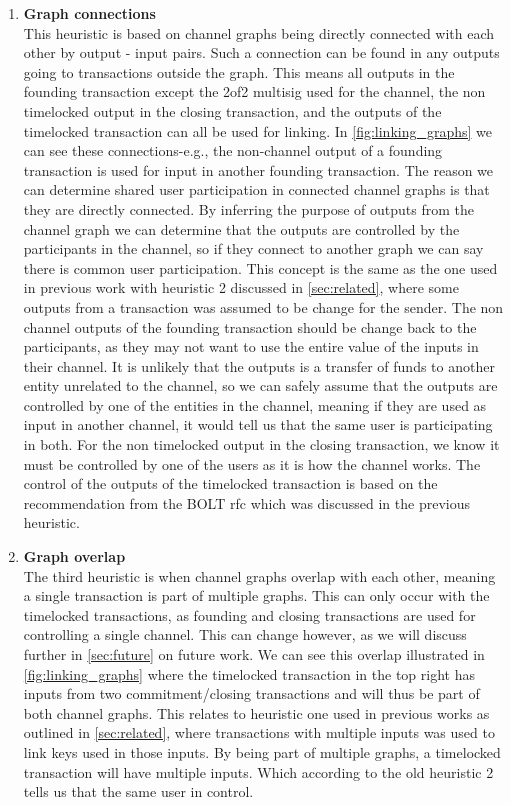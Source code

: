 \begin{enumerate}
    \item \textbf{Graph connections}\\
This heuristic is based on channel graphs being directly connected with each other by output - input pairs. Such a connection can be found in any outputs going to transactions outside the graph. 
This means all outputs in the founding transaction except the 2of2 multisig used for the channel, the non timelocked output in the closing transaction, and the outputs of the timelocked transaction can all be used for linking. 
In \cref{fig:linking_graphs} we can see these connections-e.g., the non-channel output of a founding transaction is used for input in another founding transaction. The reason we can determine shared user participation in connected channel graphs is that they are directly connected.
By inferring the purpose of outputs from the channel graph we can determine that the outputs are controlled by the participants in the channel, so if they connect to another graph we can say there is common user participation.
This concept is the same as the one used in previous work with heuristic 2 discussed in \cref{sec:related}, where some outputs from a transaction was assumed to be change for the sender. The non channel outputs of the founding transaction should be change back to the participants, as they may not want to use the entire value of the inputs in their channel. It is unlikely that the outputs is a transfer of funds to another entity unrelated to the channel, so we can safely assume that the outputs are controlled by one of the entities in the channel, meaning if they are used as input in another channel, it would tell us that the same user is participating in both. For the non timelocked output in the closing transaction, we know it must be controlled by one of the users as it is how the channel works. The control of the outputs of the timelocked transaction is based on the recommendation from the BOLT rfc \cite{bolt7} which was discussed in the previous heuristic. 

    \item \textbf{Graph overlap}\\
The third heuristic is when channel graphs overlap with each other, meaning a single transaction is part of multiple graphs. This can only occur with the timelocked transactions, as founding and closing transactions are used for controlling a single channel. This can change however, as we will discuss further in \cref{sec:future} on future work. We can see this overlap illustrated in \cref{fig:linking_graphs} where the timelocked transaction in the top right has inputs from two commitment/closing transactions and will thus be part of both channel graphs. This relates to heuristic one used in previous works as outlined in \cref{sec:related}, where transactions with multiple inputs was used to link keys used in those inputs. By being part of multiple graphs, a timelocked transaction will have multiple inputs. Which according to the old heuristic 2 tells us that the same user in control.
    
    
\end{enumerate}

